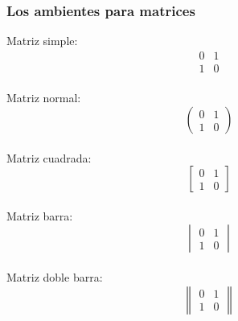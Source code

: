 \documentclass [spanish,12pt]{article}
\begin{document}
\subsubsection{Los ambientes para matrices}
Matriz simple:\\
$$
\begin{matrix}
0 & 1 \\
1 & 0
\end{matrix}
$$
\\
Matriz normal:\\
$$
\begin{pmatrix}
0 & 1 \\
1 & 0
\end{pmatrix}
$$
\\
Matriz cuadrada:\\
$$
\begin{bmatrix}
0 & 1 \\
1 & 0
\end{bmatrix}
$$
\\
Matriz barra:\\
$$
\begin{vmatrix}
0 & 1 \\
1 & 0
\end{vmatrix}
$$
\\
Matriz doble barra:\\
$$
\begin{Vmatrix}
0 & 1 \\
1 & 0
\end{Vmatrix}
$$
\end{document}
